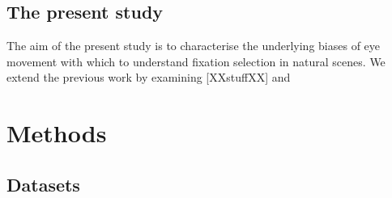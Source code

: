 \documentclass[a4paper, onecolumn, oneside, 11pt]{article}
\begin{document}



\subsection{The present study}
The aim of the present study is to characterise the underlying biases of eye movement with which to understand fixation selection in natural scenes. We extend the previous work by examining [XXstuffXX] and 

\section{Methods}

\subsection{Datasets}
\end{document}
